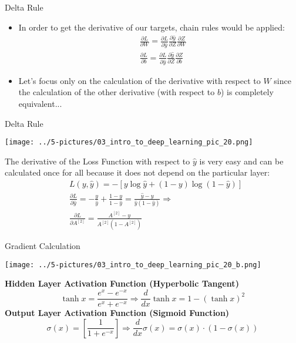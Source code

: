 \documentclass[11pt]{beamer}
\begin{document}
\begin{frame}{Delta Rule}
\begin{itemize}
\item In order to get the derivative of our targets, chain rules would be applied:
\begin{align*}
&\frac{\partial L}{\partial W} =  \frac{\partial L}{\partial \hat y} \frac{\partial \hat y}{\partial Z} \frac{\partial Z}{\partial W} \\
&\frac{\partial L}{\partial b} =  \frac{\partial L}{\partial \hat y} \frac{\partial \hat y}{\partial Z} \frac{\partial Z}{\partial b} 
\end{align*}
\item Let's focus only on the calculation of the derivative with respect to $W$ since the calculation of the other derivative (with respect to $b$) is completely equivalent...
\end{itemize}
\end{frame}
\begin{frame}{Delta Rule}
\begin{center}
\texttt{[image: ../5-pictures/03\_intro\_to\_deep\_learning\_pic\_20.png]} 
\end{center}
The derivative of the Loss Function with respect to $\hat y$ is very easy and can be calculated once for all because it does not depend on the particular layer:
\begin{align*}
&L(y, \hat{y}) = -[y\log{\hat{y}} + (1 - y)\log{(1 - \hat{y})}] \\
&\frac{\partial L}{\partial \hat y} = -\frac{y}{\hat y} + \frac{1-y}{1-\hat y} = \frac{\hat y - y}{\hat y(1 - \hat y)} \Rightarrow \\
&\frac{\partial L}{\partial A^{[2]}} = \frac{A^{[2]} - y}{A^{[2]}(1 - A^{[2]})}
\end{align*}
\end{frame}
\begin{frame}{Gradient Calculation}
\begin{center}
\texttt{[image: ../5-pictures/03\_intro\_to\_deep\_learning\_pic\_20\_b.png]} 
\end{center}
\textbf{Hidden Layer Activation Function (Hyperbolic Tangent)}
\begin{equation}
\tanh x = \frac{{{e^x} -{e^{- x}}}}{{{e^x} + {e^{ -x}}}} 
\Rightarrow 
\frac{d}{{dx}}\tanh x =  1-{\left(\tanh x \right)}^2 
\end{equation}
\textbf{Output Layer Activation Function (Sigmoid Function)} 
\begin{equation}
\sigma(x) =  \left[ \dfrac{1}{1 + e^{-x}} \right]  \Rightarrow
\dfrac{d}{dx} \sigma(x) =  \sigma(x) \cdot (1 - \sigma(x))
\end{equation}
\end{frame}
\end{document}

